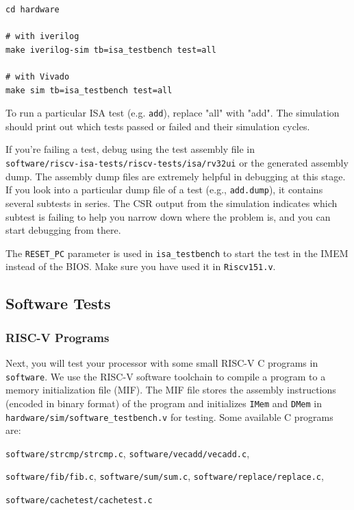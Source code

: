 \documentclass[11pt]{article}
\begin{document}

\begin{verbatim}
cd hardware

# with iverilog
make iverilog-sim tb=isa_testbench test=all

# with Vivado
make sim tb=isa_testbench test=all
\end{verbatim}

To run a particular ISA test (e.g. \verb|add|), replace "all" with "add". The simulation should print out which tests passed or failed and their simulation cycles.

If you're failing a test, debug using the test assembly file in\\\verb|software/riscv-isa-tests/riscv-tests/isa/rv32ui| or the generated assembly dump.
The assembly dump files are extremely helpful in debugging at this stage. If you look into a particular dump file of a test (e.g., \verb|add.dump|), it contains several subtests in series. The CSR output from the simulation indicates which subtest is failing to help you narrow down where the problem is, and you can start debugging from there.

The \verb|RESET_PC| parameter is used in \verb|isa_testbench| to start the test in the IMEM instead of the BIOS.
Make sure you have used it in \verb|Riscv151.v|.

\subsection{Software Tests}

\subsubsection{RISC-V Programs}

Next, you will test your processor with some small RISC-V C programs in \verb|software|.
We use the RISC-V software toolchain to compile a program to a memory initialization file
(MIF). The MIF file stores the assembly instructions (encoded in binary format)
of the program and initializes \texttt{IMem} and \texttt{DMem} in
\verb|hardware/sim/software_testbench.v| for testing.
Some available C programs are:

\verb|software/strcmp/strcmp.c|, \verb|software/vecadd/vecadd.c|,

\verb|software/fib/fib.c|, \verb|software/sum/sum.c|, \verb|software/replace/replace.c|,

\verb|software/cachetest/cachetest.c|
\end{document}
